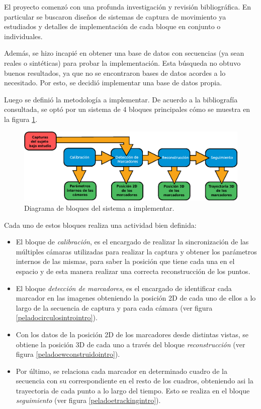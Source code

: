 \vspace{5 mm}

El proyecto comenzó con una profunda investigación y revisión bibliográfica. En particular se buscaron diseños de sistemas de captura de movimiento ya estudiados y detalles de implementación de cada bloque en conjunto o individuales. 

Además, se hizo incapié en obtener una base de datos con secuencias (ya sean reales o sintéticas) para probar la implementación. Esta búsqueda no obtuvo buenos resultados, ya que no se encontraron bases de datos acordes a lo necesitado. Por esto, se decidió implementar una base de datos propia.

 Luego se definió la metodología a implementar. De acuerdo a la bibliografía consultada, se optó por un sistema de 4 bloques principales cómo se muestra en la figura \ref{bloquesSistintro}. 

 \begin{figure}[H]
\begin{center}
\includegraphics[scale=0.8]{img/Sistema_completo/Diagrama_de_bloques.eps}
\end{center}
\caption{Diagrama de bloques del sistema a implementar.}
\label{bloquesSistintro}
\end{figure}

Cada uno de estos bloques realiza una actividad bien definida:
\begin{itemize}
\item El bloque de \emph{calibración}, es el encargado de realizar la sincronización de las múltiples cámaras utilizadas para realizar la captura y obtener los parámetros internos de las mismas, para saber la posición que tiene cada una en el espacio y de esta manera realizar una correcta reconstrucción de los puntos.
\item El bloque \emph{detección de marcadores}, es el encargado de identificar cada marcador en las imagenes obteniendo la posición 2D de cada uno de ellos a lo largo de la secuencia de captura y para cada cámara (ver figura \ref{peladocirculosintrointro}).
\item Con los datos de la posición 2D de los marcadores desde distintas vistas, se obtiene la posición 3D de cada uno a través del bloque \emph{reconstrucción} (ver figura \ref{peladoewconstruidointro}).
\item Por último, se relaciona cada marcador en determinado cuadro de la secuencia con su correspondiente en el resto de los cuadros, obteniendo asi la trayectoria de cada punto a lo largo del tiempo. Esto se realiza en el bloque \emph{seguimiento} (ver figura \ref{peladoetrackingintro}).
\end{itemize}

